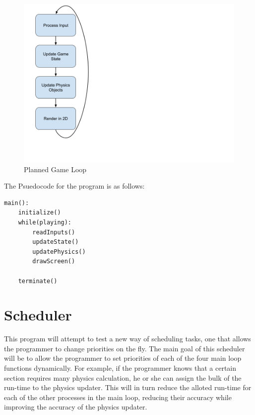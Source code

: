 \documentclass[a4paper, 12pt]{article}
\begin{document}
        \begin{figure}[H]
            \includegraphics[width=12cm]{my_loop.png}
            \centering
            \caption{Planned Game Loop}
            \label{my_loop}
        \end{figure}

        The Psuedocode for the program is as follows:

\begin{lstlisting}
main():
    initialize()
    while(playing):
        readInputs()
        updateState()
        updatePhysics()
        drawScreen()

    terminate()
\end{lstlisting}

    \section{Scheduler}

        This program will attempt to test a new way of scheduling tasks, one that allows the programmer to change priorities on the fly. The main goal of this scheduler will be to allow the programmer to set priorities of each of the four main loop functions dynamically. For example, if the programmer knows that a certain section requires many physics calculation, he or she can assign the bulk of the run-time to the physics updater. This will in turn reduce the alloted run-time for each of the other processes in the main loop, reducing their accuracy while improving the accuracy of the physics updater.
        \\
\end{document}
